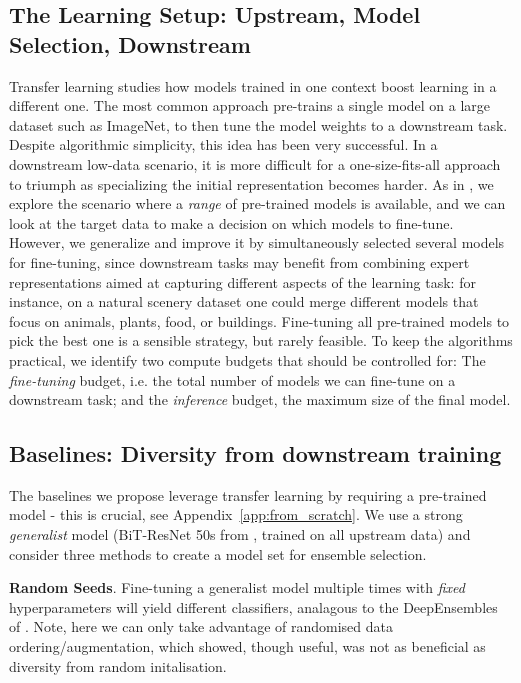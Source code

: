 \documentclass{article} \usepackage{iclr2021_conference,times}
\begin{document}
\subsection{The Learning Setup: Upstream, Model Selection, Downstream}
Transfer learning studies how models trained in one context boost learning in a different one.
The most common approach pre-trains a single model on a large dataset such as ImageNet, to then tune the model weights to a downstream task.
Despite algorithmic simplicity, this idea has been very successful.
In a downstream low-data scenario, it is more difficult for a one-size-fits-all approach to triumph as 
specializing the initial representation becomes harder.
As in \citet{puigcerver2020experts}, we explore the scenario where a \emph{range} of pre-trained models is available, 
and we can look at the target data to make a decision on which models to fine-tune.
However, we generalize and improve it by simultaneously selected several models for fine-tuning,
since downstream tasks may benefit from combining expert representations aimed 
at capturing different aspects of the learning task: for instance, on a natural scenery dataset one could merge different models that focus on animals, plants, food, or buildings.
Fine-tuning all pre-trained models to pick the best one is a sensible strategy, but rarely feasible.
To keep the algorithms practical, we identify two compute budgets that should be controlled for:
The \emph{fine-tuning} budget, i.e. the total number of models we can fine-tune on a downstream task; and 
the \emph{inference} budget, the maximum size of the final model.




\subsection{Baselines: Diversity from downstream training}
The baselines we propose leverage transfer learning by requiring a pre-trained model - this is crucial, see Appendix~\ref{app:from_scratch}.
We use a strong \emph{generalist} model (BiT-ResNet 50s from \citet{alex2019big}, trained on all upstream data) and consider three methods to create a model set for ensemble selection.

\textbf{Random Seeds}. Fine-tuning a generalist model multiple times with \emph{fixed} hyperparameters will yield different classifiers, analagous to the DeepEnsembles of \citet{balaji2017ensembles}. Note, here we can only take advantage of randomised data ordering/augmentation, which \citet{fort2019deep} showed, though useful, was not as beneficial as diversity from random initalisation.
\end{document}

